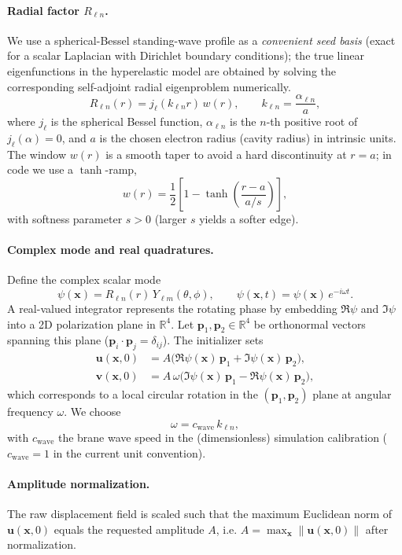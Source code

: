 \documentclass[11pt,a4paper]{article}
\newcommand{\R}{\mathbb{R}}
\newcommand{\x}{\mathbf{x}}                 %
\newcommand{\uvec}{\mathbf{u}}              %
\newcommand{\vvec}{\mathbf{v}}              %
\begin{document}
\paragraph{Radial factor \(R_{\ell n}\).}
We use a spherical-Bessel standing-wave profile as a \emph{convenient seed basis} (exact for a scalar Laplacian with Dirichlet boundary conditions); the true linear eigenfunctions in the hyperelastic model are obtained by solving the corresponding self-adjoint radial eigenproblem numerically.
\[
R_{\ell n}(r)= j_\ell(k_{\ell n} r)\,w(r),
\qquad
k_{\ell n}=\frac{\alpha_{\ell n}}{a},
\]
where \(j_\ell\) is the spherical Bessel function, \(\alpha_{\ell n}\) is the \(n\)-th positive root of
\(j_\ell(\alpha)=0\), and \(a\) is the chosen electron radius (cavity radius) in intrinsic units.
The window \(w(r)\) is a smooth taper to avoid a hard discontinuity at \(r=a\); in code we use a
\(\tanh\)-ramp,
\[
w(r)=\frac12\left[1-\tanh\!\left(\frac{r-a}{a/s}\right)\right],
\]
with softness parameter \(s>0\) (larger \(s\) yields a softer edge).

\paragraph{Complex mode and real quadratures.}
Define the complex scalar mode
\[
\psi(\x)=R_{\ell n}(r)\,Y_{\ell m}(\theta,\phi),
\qquad
\psi(\x,t)=\psi(\x)\,e^{-i\omega t}.
\]
A real-valued integrator represents the rotating phase by embedding \(\Re\psi\) and \(\Im\psi\) into a
2D polarization plane in \(\R^4\). Let \(\mathbf{p}_1,\mathbf{p}_2\in\R^4\) be orthonormal vectors spanning this
plane (\(\mathbf{p}_i\cdot\mathbf{p}_j=\delta_{ij}\)). The initializer sets
\begin{align}
\uvec(\x,0) &= A\big(\Re\psi(\x)\,\mathbf{p}_1+\Im\psi(\x)\,\mathbf{p}_2\big),\\
\vvec(\x,0) &= A\,\omega\big(\Im\psi(\x)\,\mathbf{p}_1-\Re\psi(\x)\,\mathbf{p}_2\big),
\end{align}
which corresponds to a local circular rotation in the \((\mathbf{p}_1,\mathbf{p}_2)\) plane at angular frequency
\(\omega\). We choose
\[
\omega = c_{\mathrm{wave}}\,k_{\ell n},
\]
with \(c_{\mathrm{wave}}\) the brane wave speed in the (dimensionless) simulation calibration
(\(c_{\mathrm{wave}}=1\) in the current unit convention).

\paragraph{Amplitude normalization.}
The raw displacement field is scaled such that the maximum Euclidean norm of \(\uvec(\x,0)\) equals the
requested amplitude \(A\), i.e. \(A=\max_{\x}\|\uvec(\x,0)\|\) after normalization.
\end{document}

